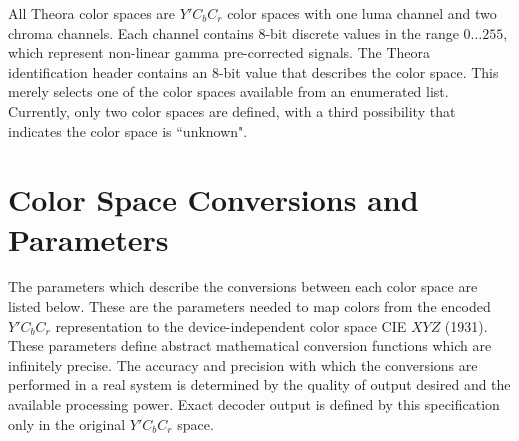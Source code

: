 \documentclass[9pt,letterpaper]{book}
\numberwithin{equation}{chapter}
\numberwithin{figure}{chapter}
\numberwithin{table}{chapter}
\begin{document}
All Theora color spaces are $Y'C_bC_r$ color spaces with one luma channel and
 two chroma channels.
Each channel contains 8-bit discrete values in the range $0\ldots255$, which
 represent non-linear gamma pre-corrected signals.
The Theora identification header contains an 8-bit value that describes the
 color space.
This merely selects one of the color spaces available from an enumerated list.
Currently, only two color spaces are defined, with a third possibility that
 indicates the color space is ``unknown".

\section{Color Space Conversions and Parameters}
\label{sec:color-xforms}

The parameters which describe the conversions between each color space are
 listed below.
These are the parameters needed to map colors from the encoded $Y'C_bC_r$
 representation to the device-independent color space CIE $XYZ$ (1931).
These parameters define abstract mathematical conversion functions which are
 infinitely precise.
The accuracy and precision with which the conversions are performed in a real
 system is determined by the quality of output desired and the available
 processing power.
Exact decoder output is defined by this specification only in the original
 $Y'C_bC_r$ space.
\end{document}
